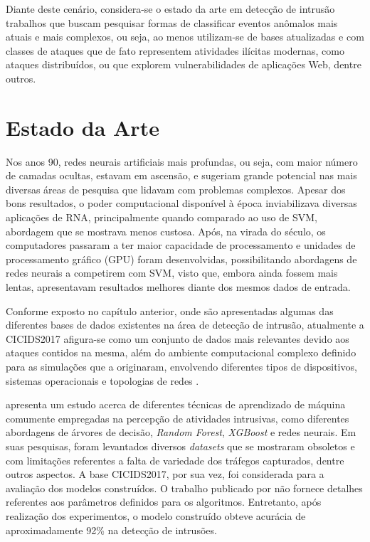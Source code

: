 Diante deste cenário, considera-se o estado da arte em detecção de intrusão trabalhos que buscam pesquisar formas de classificar eventos anômalos mais atuais e mais complexos, ou seja, ao menos utilizam-se de bases atualizadas e com classes de ataques que de fato representem atividades ilícitas modernas, como ataques distribuídos, ou que explorem vulnerabilidades de aplicações Web, dentre outros.

\section{Estado da Arte}

Nos anos 90, redes neurais artificiais mais profundas, ou seja, com maior número de camadas ocultas, estavam em ascensão, e sugeriam grande potencial nas mais diversas áreas de pesquisa que lidavam com problemas complexos. Apesar dos bons resultados, o poder computacional disponível à época inviabilizava diversas aplicações de RNA, principalmente quando comparado ao uso de SVM, abordagem que se mostrava menos custosa. Após, na virada do século, os computadores passaram a ter maior capacidade de processamento e unidades de processamento gráfico (GPU) foram desenvolvidas, possibilitando abordagens de redes neurais a competirem com SVM, visto que, embora ainda fossem mais lentas, apresentavam resultados melhores diante dos mesmos dados de entrada.

Conforme exposto no capítulo anterior, onde são apresentadas algumas das diferentes bases de dados existentes na área de detecção de intrusão, atualmente a CICIDS2017 afigura-se como um conjunto de dados mais relevantes devido aos ataques contidos na mesma, além do ambiente computacional complexo definido para as simulações que a originaram, envolvendo diferentes tipos de dispositivos, sistemas operacionais e topologias de redes \cite{sharafaldin2018}.

 apresenta um estudo acerca de diferentes técnicas de aprendizado de máquina comumente empregadas na percepção de atividades intrusivas, como diferentes abordagens de árvores de decisão, \textit{Random Forest}, \textit{XGBoost} e redes neurais. Em suas pesquisas, foram levantados diversos \textit{datasets} que se mostraram obsoletos e com limitações referentes a falta de variedade dos tráfegos capturados, dentre outros aspectos. A base CICIDS2017, por sua vez, foi considerada para a avaliação dos modelos construídos. O trabalho publicado por  não fornece detalhes referentes aos parâmetros definidos para os algoritmos. Entretanto, após realização dos experimentos, o modelo construído obteve acurácia de aproximadamente 92\% na detecção de intrusões.

